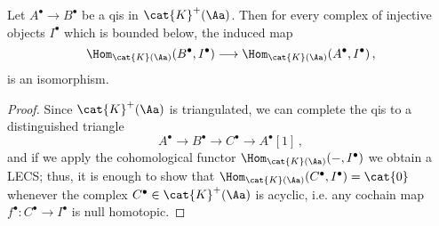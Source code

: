 \begin{lemma}\label{lemma-qis}
    Let $A^{\bullet} \to B^{\bullet}$ be a qis in $\cat{K}^{+}(\Aa)$.
    Then for every complex of injective objects $I^{\bullet}$ 
    which is bounded below, the induced map
    \begin{equation*}
        \Hom_{\cat{K}(\Aa)}(B^{\bullet}, I^{\bullet})
        \longrightarrow \Hom_{\cat{K}(\Aa)}(A^{\bullet},I^{\bullet})\,,
    \end{equation*}
    is an isomorphism.
    \begin{proof}
        Since $\cat{K}^{+}(\Aa)$ is triangulated, 
        we can complete the qis to a distinguished triangle
        \begin{equation*}
            A^{\bullet} \longrightarrow B^{\bullet}
            \longrightarrow C^{\bullet}
            \longrightarrow A^{\bullet}{[1]}\,,
        \end{equation*}
        and if we apply the cohomological functor
        $\Hom_{\cat{K}(\Aa)}(-,I^{\bullet})$ we obtain a LECS;
        thus, it is enough to show that 
        $\Hom_{\cat{K}(\Aa)}(C^{\bullet},I^{\bullet}) = \cat{0}$
        whenever the complex $C^{\bullet} \in \cat{K}^{+}(\Aa)$
        is acyclic, i.e. any cochain map 
        $f^{\bullet}:C^{\bullet} \to I^{\bullet}$
        is null homotopic.


\end{proof}
\end{lemma}
